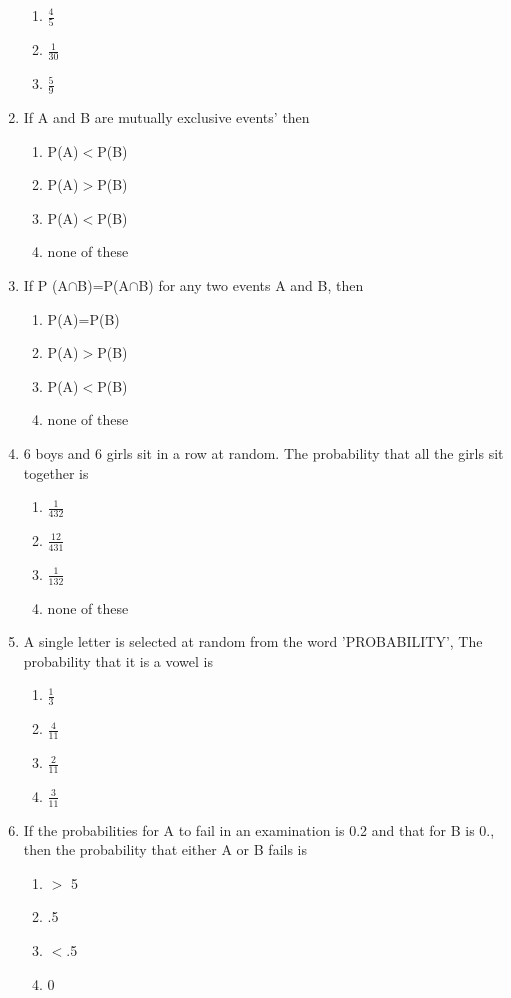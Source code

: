 \documentclass[12pt]{article}
\begin{document}
\begin{enumerate}
\begin{enumerate}
\item $\frac{4}{5}$
\item $\frac{1}{30}$
\item $\frac{5}{9}$
\end{enumerate}
\item If A and B are mutually exclusive events' then
\begin{enumerate}
\item P(A)$<$P(B)
\item P(A)$>$P(B)
\item P(A)$<$P(B)
\item none of these
\end{enumerate}
\item If P (A$\cap$B)=P(A$\cap$B) for any two events A and B, then 
\begin{enumerate}
\item P(A)=P(B)
\item P(A)$>$P(B)
\item P(A)$<$P(B)
\item none of these
\end{enumerate}
\item 6 boys and 6 girls sit in a row at random. The probability that all the girls sit together is
\begin{enumerate}
\item $\frac{1}{432}$
\item $\frac{12}{431}$
\item $\frac{1}{132}$
\item none of these
\end{enumerate}
\item A single letter is selected at random from the word 'PROBABILITY', The probability that it is a vowel is
\begin{enumerate}
\item $\frac{1}{3}$
\item $\frac{4}{11}$
\item $\frac{2}{11}$
\item $\frac{3}{11}$
\end{enumerate}
\item If the probabilities for A to fail in an examination is 0.2 and that for B is 0., then the probability that either A or B fails is
\begin{enumerate}
\item $>$ 5 
\item .5
\item $<$.5
\item 0
\end{enumerate}

\end{enumerate}
\end{document}

